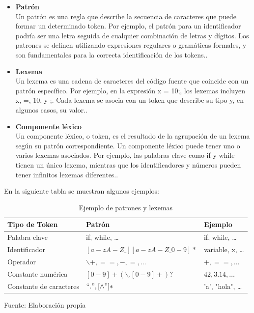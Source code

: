 \begin{itemize}
  \item \textbf{Patrón} \\
  Un patrón es una regla que describe la secuencia de caracteres que puede formar un determinado token. Por ejemplo, el patrón para un identificador podría ser una letra seguida de cualquier combinación de letras y dígitos. Los patrones se definen utilizando expresiones regulares o gramáticas formales, y son fundamentales para la correcta identificación de los tokens.. \parencite{Jeffery2021}
  \newline
  \item \textbf{Lexema} \\
  Un lexema es una cadena de caracteres del código fuente que coincide con un patrón específico. Por ejemplo, en la expresión x = 10;, los lexemas incluyen x, =, 10, y ;. Cada lexema se asocia con un token que describe su tipo y, en algunos casos, su valor.. \parencite{Jeffery2021}
  \item \textbf{Componente léxico} \\
  Un componente léxico, o token, es el resultado de la agrupación de un lexema según su patrón correspondiente. Un componente léxico puede tener uno o varios lexemas asociados. Por ejemplo, las palabras clave como if y while tienen un único lexema, mientras que los identificadores y números pueden tener infinitos lexemas diferentes.. \parencite{Jeffery2021}
\end{itemize}

En la siguiente tabla se muestran algunos ejemplos:

\begin{table}[!h]
  \begin{center}
    \begin{tabularx}{0.8\textwidth}{|X|X|X|}
      \hline
      \textbf{Tipo de Token} & \textbf{Patrón} & \textbf{Ejemplo} \\
      \hline
      Palabra clave & if, while, … & if, while, … \\
      \hline
      Identificador & $[a-zA-Z\_] [a-zA-Z\_0-9]*$ & variable, x, … \\
      \hline
      Operador & $\backslash +, ==, -, =, …$ & $+, ==, …$ \\
      \hline
      Constante numérica & $[0-9]+(\backslash .[0-9]+)?$ & $42, 3.14, …$ \\
      \hline
      Constante de caracteres & $``.", [\land "]*$ & 'a', "hola", … \\
      \hline
    \end{tabularx}
  \end{center}
  \caption{Ejemplo de patrones y lexemas}
  \centering Fuente: Elaboración propia
  \label{tab:patrones}
\end{table}

